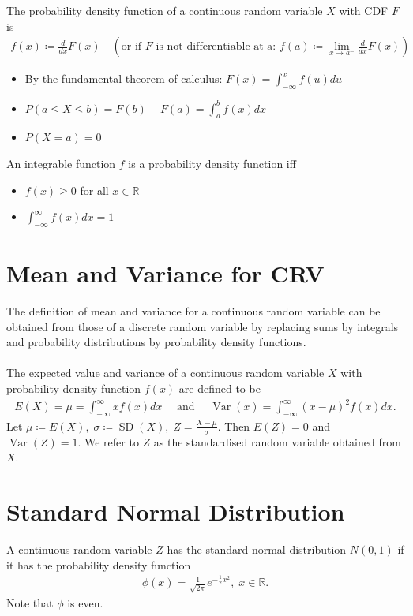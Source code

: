 \documentclass{report}
\newcommand{\Var}{\operatorname{Var}}
\begin{document}
\begin{enumerate}
	 The probability density function of a continuous random variable $X$ with CDF $F$ is
	 \begin{align*}
		f(x) \coloneq \frac{d}{dx} F(x) \quad \left(\text{or if $F$ is not differentiable at a:\ } f(a) \coloneq \lim_{x\to a^-} \frac{d}{dx}F(x)\right)
	 \end{align*}
	 \begin{itemize}
		\item By the fundamental theorem of calculus: $F(x) = \int_{-\infty}^x f(u) du$
		\item $P(a \leq X \leq b) = F(b) - F(a) = \int_a^b f(x) dx$
		\item $P(X = a) = 0$
	 \end{itemize}
	 An integrable function $f$ is a probability density function iff
	 \begin{itemize}
	 	\item $f(x) \geq 0$ for all $x \in \mathbb{R}$
		\item $\int_{-\infty}^\infty f(x) dx = 1$
	 \end{itemize}

	 \section{Mean and Variance for CRV}

	 	The definition of mean and variance for a continuous random variable can be obtained from those of a discrete random variable by replacing sums by integrals and probability distributions by probability density functions.
		\\ \\
		The expected value and variance of a continuous random variable $X$ with probability density function $f(x)$ are defined to be
		\begin{align*}
			E(X) = \mu = \int_{-\infty}^\infty xf(x) dx \quad \text{ and } \quad \Var(x) = \int_{-\infty}^\infty (x - \mu)^2 f(x) dx.
		\end{align*}
		Let $\mu \coloneq E(X), \; \sigma \coloneq \operatorname{SD}(X), \; Z = \frac{X - \mu}{\sigma}$. Then $E(Z) = 0$ and $\Var(Z) = 1$. We refer to $Z$ as the standardised random variable obtained from $X$.

	\section{Standard Normal Distribution}

		A continuous random variable $Z$ has the standard normal distribution $N(0,1)$ if it has the probability density function
		\begin{align*}
			\phi(x) = \frac{1}{\sqrt{2\pi}} e^{-\frac{1}{2}x^2}, \; x \in \mathbb{R}.
		\end{align*}
		Note that $\phi$ is even.


\end{enumerate}
\end{document}
